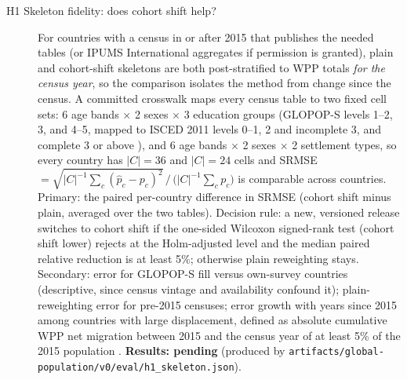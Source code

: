 \documentclass[10pt]{article}
\newcommand{\pending}[1]{\textbf{Results: pending} (produced by \nolinkurl{#1})}
\begin{document}
\begin{description}
  \item[H1 Skeleton fidelity: does cohort shift help?] For countries with a census in or after 2015 that publishes the needed tables (or IPUMS International aggregates if permission is granted), plain and cohort-shift skeletons are both post-stratified to WPP totals \emph{for the census year}, so the comparison isolates the method from change since the census. A committed crosswalk maps every census table to two fixed cell sets: 6 age bands $\times$ 2 sexes $\times$ 3 education groups (GLOPOP-S levels 1--2, 3, and 4--5, mapped to ISCED 2011 levels 0--1, 2 and incomplete 3, and complete 3 or above \citep{isced2011}), and 6 age bands $\times$ 2 sexes $\times$ 2 settlement types, so every country has $|C| = 36$ and $|C| = 24$ cells and SRMSE $= \sqrt{|C|^{-1}\sum_c(\hat p_c - p_c)^2}\,\big/\,\big(|C|^{-1}\sum_c p_c\big)$ is comparable across countries. Primary: the paired per-country difference in SRMSE (cohort shift minus plain, averaged over the two tables). Decision rule: a new, versioned release switches to cohort shift if the one-sided Wilcoxon signed-rank test (cohort shift lower) rejects at the Holm-adjusted level and the median paired relative reduction is at least 5\%; otherwise plain reweighting stays. Secondary: error for GLOPOP-S fill versus own-survey countries (descriptive, since census vintage and availability confound it); plain-reweighting error for pre-2015 censuses; error growth with years since 2015 among countries with large displacement, defined as absolute cumulative WPP net migration between 2015 and the census year of at least 5\% of the 2015 population \citep{wpp2024}. \pending{artifacts/global-population/v0/eval/h1_skeleton.json}.

\end{description}
\end{document}
